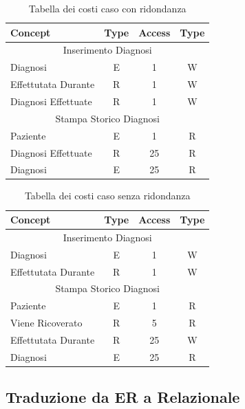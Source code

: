 \documentclass{article}
\begin{document}
\begin{table}[!ht]
  \caption{Tabella dei costi caso con ridondanza}
  \label{table:3}
  \centering
  \begin{tabular}{|l|c|c|c|}
  \hline
  \textbf{Concept} & \textbf{Type} & \textbf{Access} & \textbf{Type} \\ \hline
  \multicolumn{4}{|c|}{Inserimento Diagnosi} \\ \hline
  Diagnosi & E & 1 & W \\ \hline
  Effettutata Durante & R & 1 & W \\ \hline
  Diagnosi Effettuate & R & 1 & W \\ \hline
  \multicolumn{4}{|c|}{Stampa Storico Diagnosi} \\ \hline
  Paziente & E & 1 & R \\ \hline
  Diagnosi Effettuate & R & 25 & R \\ \hline
  Diagnosi & E & 25 & R \\ \hline
  \end{tabular}
  \end{table}
\begin{table}[!ht]
  \caption{Tabella dei costi caso senza ridondanza}
  \label{table:4}
  \centering
  \begin{tabular}{|l|c|c|c|}
    \hline
    \textbf{Concept} & \textbf{Type} & \textbf{Access} & \textbf{Type} \\ \hline
    \multicolumn{4}{|c|}{Inserimento Diagnosi} \\ \hline
    Diagnosi & E & 1 & W \\ \hline
    Effettutata Durante & R & 1 & W \\ \hline
    \multicolumn{4}{|c|}{Stampa Storico Diagnosi} \\ \hline
    Paziente & E & 1 & R \\ \hline
    Viene Ricoverato & R & 5 & R \\ \hline
    Effettutata Durante & R & 25 & W \\ \hline
    Diagnosi & E & 25 & R \\ \hline
  \end{tabular}
\end{table}

\subsection{Traduzione da ER a Relazionale}

\end{document}

